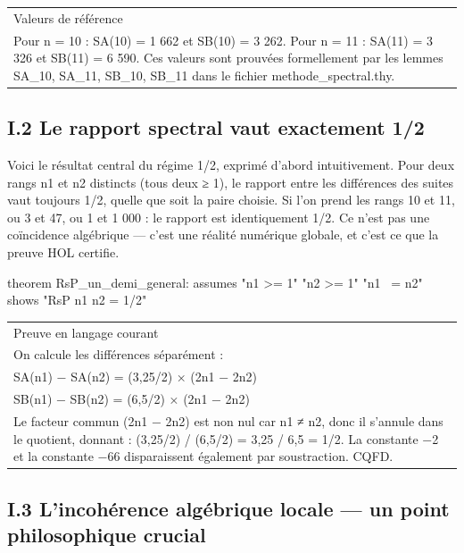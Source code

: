 \documentclass[11pt,a4paper]{article}
\begin{document}
\begin{longtable}{|p{}|}
\hline
Valeurs de référence \\ Pour n = 10 : SA(10) = 1 662 et SB(10) = 3 262. Pour n = 11 : SA(11) = 3 326 et SB(11) = 6 590. Ces valeurs sont prouvées formellement par les lemmes SA\_10, SA\_11, SB\_10, SB\_11 dans le fichier methode\_spectral.thy. \\
\hline
\end{longtable}


\subsection{I.2 Le rapport spectral vaut exactement 1/2}

Voici le résultat central du régime 1/2, exprimé d'abord intuitivement. Pour deux rangs n1 et n2 distincts (tous deux ≥ 1), le rapport entre les différences des suites vaut toujours 1/2, quelle que soit la paire choisie. Si l'on prend les rangs 10 et 11, ou 3 et 47, ou 1 et 1 000 : le rapport est identiquement 1/2. Ce n'est pas une coïncidence algébrique — c'est une réalité numérique globale, et c'est ce que la preuve HOL certifie.

\begin{holcode}[title={Code HOL — Théorème RsP = 1/2 (régime central)}]
theorem RsP_un_demi_general:
 assumes "n1 >= 1" "n2 >= 1" "n1 ~= n2"
 shows "RsP n1 n2 = 1/2"
\end{holcode}


\begin{longtable}{|p{}|}
\hline
Preuve en langage courant \\ On calcule les différences séparément : \\ SA(n1) − SA(n2) = (3,25/2) × (2n1 − 2n2) \\ SB(n1) − SB(n2) = (6,5/2) × (2n1 − 2n2) \\ Le facteur commun (2n1 − 2n2) est non nul car n1 ≠ n2, donc il s'annule dans le quotient, donnant : (3,25/2) / (6,5/2) = 3,25 / 6,5 = 1/2. La constante −2 et la constante −66 disparaissent également par soustraction. CQFD. \\
\hline
\end{longtable}


\subsection{I.3 L'incohérence algébrique locale — un point philosophique crucial}
\end{document}

